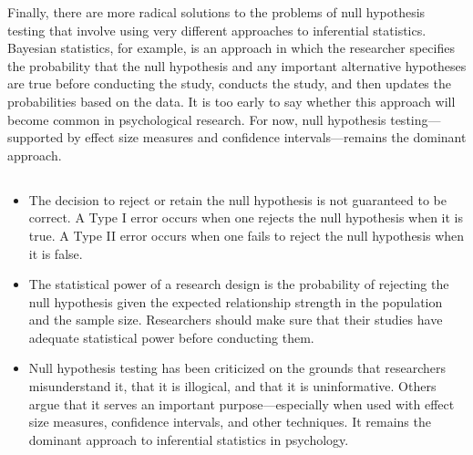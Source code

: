 Finally, there are more radical solutions to the problems of null hypothesis testing that involve using very different approaches to inferential statistics. Bayesian statistics, for example, is an approach in which the researcher specifies the probability that the null hypothesis and any important alternative hypotheses are true before conducting the study, conducts the study, and then updates the probabilities based on the data. It is too early to say whether this approach will become common in psychological research. For now, null hypothesis testing---supported by effect size measures and confidence intervals---remains the dominant approach.

\subsection{}
\begin{fullwidth}
\begin{itemize}
\item The decision to reject or retain the null hypothesis is not guaranteed to be correct. A Type I error occurs when one rejects the null hypothesis when it is true. A Type II error occurs when one fails to reject the null hypothesis when it is false.

\item The statistical power of a research design is the probability of rejecting the null hypothesis given the expected relationship strength in the population and the sample size. Researchers should make sure that their studies have adequate statistical power before conducting them.

\item Null hypothesis testing has been criticized on the grounds that researchers misunderstand it, that it is illogical, and that it is uninformative. Others argue that it serves an important purpose---especially when used with effect size measures, confidence intervals, and other techniques. It remains the dominant approach to inferential statistics in psychology.
  
\end{itemize}
\end{fullwidth}

 

